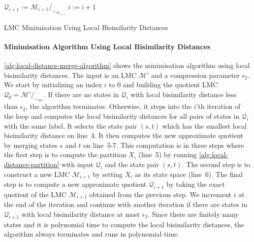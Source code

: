 \documentclass[a4paper,UKenglish,cleveref,autoref,thm-restate]{lipics-v2021}
\newcommand{\M}{\mathcal{M}}
\newcommand{\Hyp}{\mathcal{M}'}%
\newcommand{\Q}{\mathcal{Q}}
\begin{document}
\begin{algorithm}[h]
{		%
		$\Q_{i+1} := \M_{i+1} /_{\sim_{\M_{i+1}}}$\;
		$i := i+1$\;
	}
	\caption{LMC Minimisation Using Local Bisimilarity Distances}
	\label{alg:local-distance-merge-algorithm}
\end{algorithm}

\paragraph*{Minimisation Algorithm Using Local Bisimilarity Distances}
\label{subsubsection:minimisation-algorithm-local-bisimilarity-distances}
\cref{alg:local-distance-merge-algorithm} shows the minimisation algorithm using local bisimilarity distances. The input is an LMC $\Hyp$ and a compression parameter $\epsilon_2$. We start by initializing an index $i$ to $0$ and building the quotient LMC $\Q_{0} = \Hyp /_{\sim_{\Hyp}}$. If there are no states in $\Q_{i}$ with local bisimilarity distance less than $\epsilon_2$, the algorithm terminates. Otherwise, it steps into the $i$'th iteration of the loop and computes the local bisimilarity distances for all pairs of states in $\Q_{i}$ with the same label. It selects the state pair $(s, t)$ which has the smallest local bisimilarity distance on line~4. It then computes the new approximate quotient by merging states $s$ and $t$ on line~$5$-$7$. This computation is in three steps where the first step is to compute the partition $X_i$ (line~5) by running \cref{alg:local-distance-partition} with input $\Q_i$ and the state pair $(s, t)$. The second step is to construct a new LMC $\M_{i+1}$ by setting $X_i$ as its state space (line~6). The final step is to compute a new approximate quotient $\Q_{i+1}$ by taking the exact quotient of the LMC $\M_{i+1}$ obtained from the previous step.
We increment $i$ at the end of the iteration and continue with another iteration if there are states in $\Q_{i+1}$ with local bisimilarity distance at most $\epsilon_2$. Since there are finitely many states and it is polynomial time to compute the local bisimilarity distances, the algorithm always terminates and runs in polynomial time.
\end{document}
